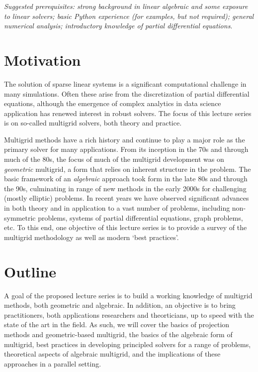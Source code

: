 \documentclass[article,letterpaper,11pt,oldfontcommands]{memoir}
\begin{document}
\medskip
\textit{Suggested prerequisites: strong background in
  linear algebraic and some exposure to linear solvers; basic Python experience
  (for examples, but not required); general numerical analysis; introductory knowledge of partial
differential equations}.

\section*{Motivation}
The solution of sparse linear systems is a significant computational challenge
in many simulations.  Often these arise from the discretization of partial
differential equations, although the emergence of complex analytics in data
science application has renewed interest in robust solvers.  The focus of this
lecture series is on so-called multigrid solvers, both theory and
practice.

Multigrid methods have a rich history and continue to play a major role as
the primary solver for many applications.  From its inception in the 70s and
through much of the 80s, the focus of much of the multigrid development was on
\textit{geometric} multigrid, a form that relies on inherent structure in the
problem.  The basic framework of an \textit{algebraic} approach took form in
the late 80s and through the 90s, culminating in range of new methods in the
early 2000s for challenging (mostly elliptic) problems.  In recent years we
have observed significant advances in both theory and in application to a vast
number of problems, including non-symmetric problems, systems of partial
differential equations, graph problems, etc.  To this end, one objective of
this lecture series is to provide a survey of the multigrid methodology as well
as modern `best practices'.

\newpage
\section*{Outline}

A goal of the proposed lecture series is to build a working knowledge of
multigrid methods, both geometric and algebraic.  In addition, an objective is
to bring practitioners, both applications researchers and theorticians, up to
speed with the state of the art in the field.  As such, we will cover the basics
of projection methods and geometric-based multigrid, the basics of the
algebraic form of multigrid, best practices in developing principled solvers
for a range of problems, theoretical aspects of algebraic multigrid, and the
implications of these approaches in a parallel setting.
\end{document}
